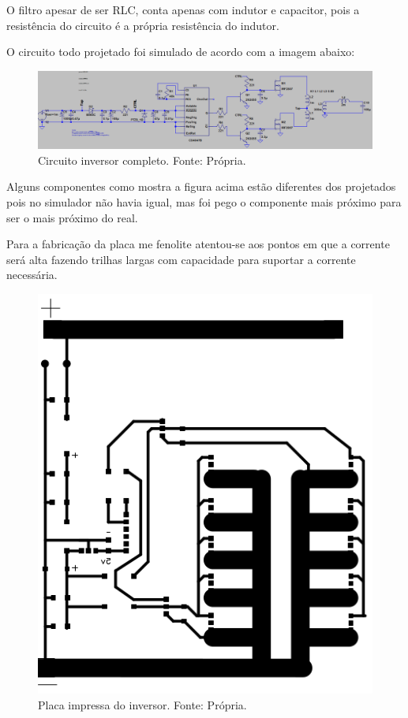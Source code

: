 				O filtro apesar de ser RLC, conta apenas com indutor e capacitor, pois a 						resistência do circuito é a própria resistência do indutor.
				
				O circuito todo projetado foi simulado de acordo com a imagem abaixo:
				
                \begin{figure}[!htb]
            		\centering
            		\includegraphics[scale= 0.4]{figuras/Circuito_inversor.png}
            		\caption{Circuito inversor completo. Fonte: Própria.}
            		\label{inversor}
            	\end{figure} 
            					
				Alguns componentes como mostra a figura acima estão diferentes dos projetados 					pois no simulador não havia igual, mas foi pego o componente mais próximo para 				ser o mais próximo do real.
				
				Para a fabricação da placa me fenolite atentou-se aos pontos em que a corrente 				será alta fazendo trilhas largas com capacidade para suportar a corrente 						necessária.

                \begin{figure}[!htb]
            		\centering
            		\includegraphics[scale= 0.4]{figuras/Placa_inversor.png}
            		\caption{Placa impressa do inversor. Fonte: Própria.}
            		\label{inversor-projeto}
            	\end{figure} 		

